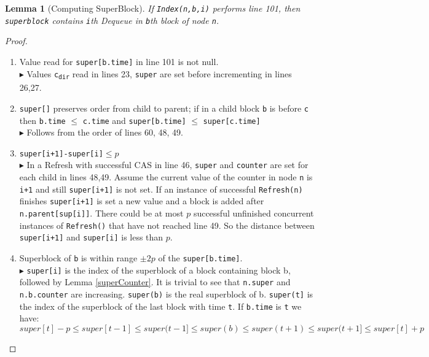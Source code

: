 \documentclass[10pt]{article}
\newtheorem{lemma}[theorem]{Lemma}
\theoremstyle{definition}
\begin{document}
\begin{lemma}[Computing SuperBlock]\label{superBlock}
  If \texttt{Index(n,b,i)} performs line 101, then \texttt{superblock} contains \texttt{i}th Dequeue in \texttt{b}th block of node \texttt{n}.
\end{lemma}
\begin{proof}
\begin{enumerate}
 \item Value read for \texttt{super[b.time]} in line 101 is not null.\\$\blacktriangleright$
  Values \texttt{c\textsubscript{dir}} read in lines 23, \texttt{super} are set before incrementing in lines 26,27.

 \item \texttt{super[]} preserves order from child to parent; if in a child block \texttt{b} is before \texttt{c} then \texttt{b.time} $\leq$ \texttt{c.time} and \texttt{super[b.time]} $\leq$ \texttt{super[c.time]}\\$\blacktriangleright$
  Follows from the order of lines 60, 48, 49.

 \item \texttt{super[i+1]-super[i]}$\leq p$
\\$\blacktriangleright$
 In a Refresh with successful CAS in line 46, \texttt{super} and \texttt{counter} are set for each child in lines 48,49. Assume the current value of the counter in node \texttt{n} is \texttt{i+1} and still \texttt{super[i+1]} is not set. If an instance of successful \texttt{Refresh(n)} finishes \texttt{super[i+1]} is set a new value and a block is added after \texttt{n.parent[sup[i]]}. There could be at most $p$ successful unfinished concurrent instances of \texttt{Refresh()} that have not reached line 49. So the distance between \texttt{super[i+1]} and \texttt{super[i]} is less than $p$.

 \item Superblock of \texttt{b} is within range $\pm 2p$ of the \texttt{super[b.time]}.
\\$\blacktriangleright$
\texttt{super[i]} is the index of the superblock of a block containing block b, followed by Lemma \ref{superCounter}. It is trivial to see that \texttt{n.super} and \texttt{n.b.counter} are increasing. \texttt{super(b)} is the real superblock of b. \texttt{super(t]} is the index of the superblock of the last block with time \texttt{t}. If \texttt{b.time} is \texttt{t} we have:
$$super[t]-p\leq super[t-1]\leq super(t-1] \leq super(b) \leq super(t+1)\leq super(t+1]\leq super[t]+p$$

\end{enumerate}
\end{proof}
\end{document}
